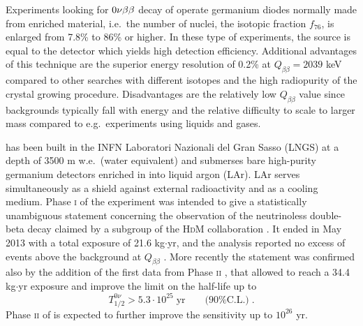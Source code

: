 Experiments looking for $0\nu\beta\beta$ decay of  operate germanium diodes normally made from enriched material, i.e.~the number of  nuclei, the isotopic fraction $f_{76}$, is enlarged from 7.8\% to 86\% or higher. In these type of experiments, the source is equal to the detector which yields high detection efficiency. Additional advantages of this technique are the superior energy resolution of 0.2\% at $Q_{\beta\beta}=2039$ keV compared to other searches with different isotopes and the high radiopurity of the crystal growing procedure. Disadvantages are the relatively low $Q_{\beta\beta}$ value since backgrounds typically fall with energy and the relative difficulty to scale to larger mass compared to e.g.~experiments using liquids and gases.

{\gerda} has been built in the INFN Laboratori Nazionali del Gran Sasso (LNGS) at a depth of 3500 m w.e.~(water equivalent) and submerses bare high-purity germanium detectors enriched in  into liquid argon (LAr). LAr serves simultaneously as a shield against external radioactivity and as a cooling medium. Phase \textsc{i} of the experiment was intended to give a statistically unambiguous statement concerning the observation of the neutrinoless double-beta decay claimed by a subgroup of the \textsc{HdM} collaboration \cite{hdmclaim}. It ended in May 2013 with a total exposure of 21.6 kg$\cdot$yr, and the analysis reported no excess of events above the background at $Q_{\beta\beta}$ \cite{resultsphase1}. More recently the statement was confirmed also by the addition of the first data from Phase \textsc{ii} \cite{nature}, that allowed to reach a 34.4 kg$\cdot$yr exposure and improve the limit on the half-life up to
\begin{equation}T_{1/2}^{0\nu}>5.3\cdot10^{25}\;\text{yr}\qquad\text{(90\% C.L.)}\;.\end{equation}
Phase \textsc{ii} of {\gerda} is expected to further improve the sensitivity up to $10^{26}$ yr.

